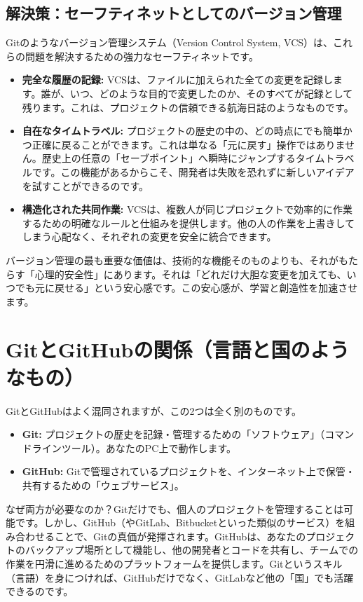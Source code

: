 \documentclass{ltjsarticle}
\begin{document}
\subsection{解決策：セーフティネットとしてのバージョン管理}
Gitのようなバージョン管理システム（Version Control System, VCS）は、これらの問題を解決するための強力なセーフティネットです。
\begin{itemize}
    \item \textbf{完全な履歴の記録:} VCSは、ファイルに加えられた全ての変更を記録します。誰が、いつ、どのような目的で変更したのか、そのすべてが記録として残ります。これは、プロジェクトの信頼できる航海日誌のようなものです。
    \item \textbf{自在なタイムトラベル:} プロジェクトの歴史の中の、どの時点にでも簡単かつ正確に戻ることができます。これは単なる「元に戻す」操作ではありません。歴史上の任意の「セーブポイント」へ瞬時にジャンプするタイムトラベルです。この機能があるからこそ、開発者は失敗を恐れずに新しいアイデアを試すことができるのです。
    \item \textbf{構造化された共同作業:} VCSは、複数人が同じプロジェクトで効率的に作業するための明確なルールと仕組みを提供します。他の人の作業を上書きしてしまう心配なく、それぞれの変更を安全に統合できます。
\end{itemize}
バージョン管理の最も重要な価値は、技術的な機能そのものよりも、それがもたらす「心理的安全性」にあります。それは「どれだけ大胆な変更を加えても、いつでも元に戻せる」という安心感です。この安心感が、学習と創造性を加速させます。

\section{GitとGitHubの関係（言語と国のようなもの）}
GitとGitHubはよく混同されますが、この2つは全く別のものです。
\begin{itemize}
    \item \textbf{Git:} プロジェクトの歴史を記録・管理するための「ソフトウェア」（コマンドラインツール）。あなたのPC上で動作します。
    \item \textbf{GitHub:} Gitで管理されているプロジェクトを、インターネット上で保管・共有するための「ウェブサービス」。
\end{itemize}
なぜ両方が必要なのか？Gitだけでも、個人のプロジェクトを管理することは可能です。しかし、GitHub（やGitLab、Bitbucketといった類似のサービス）を組み合わせることで、Gitの真価が発揮されます。GitHubは、あなたのプロジェクトのバックアップ場所として機能し、他の開発者とコードを共有し、チームでの作業を円滑に進めるためのプラットフォームを提供します。Gitというスキル（言語）を身につければ、GitHubだけでなく、GitLabなど他の「国」でも活躍できるのです。
\end{document}
